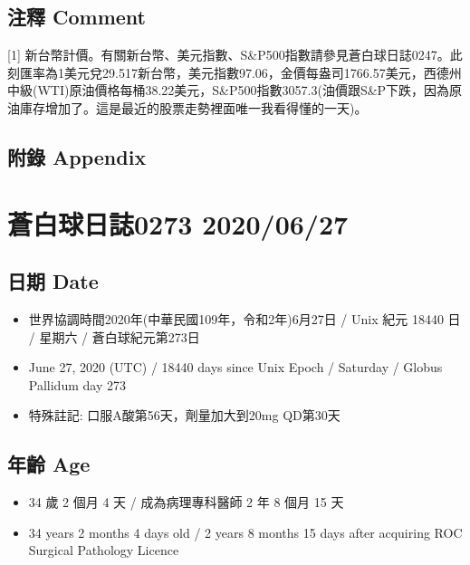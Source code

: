 \documentclass[
]{article}
\providecommand{\tightlist}{%
  \setlength{\itemsep}{0pt}\setlength{\parskip}{0pt}}
\begin{document}
\hypertarget{ux6ce8ux91cb-comment-21}{%
\subsection{注釋 Comment}\label{ux6ce8ux91cb-comment-21}}

{[}1{]}
新台幣計價。有關新台幣、美元指數、S\&P500指數請參見蒼白球日誌0247。此刻匯率為1美元兌29.517新台幣，美元指數97.06，金價每盎司1766.57美元，西德州中級(WTI)原油價格每桶38.22美元，S\&P500指數3057.3(油價跟S\&P下跌，因為原油庫存增加了。這是最近的股票走勢裡面唯一我看得懂的一天)。

\hypertarget{ux9644ux9304-appendix-21}{%
\subsection{附錄 Appendix}\label{ux9644ux9304-appendix-21}}

\hypertarget{ux84bcux767dux7403ux65e5ux8a8c0273-20200627}{%
\section{蒼白球日誌0273
2020/06/27}\label{ux84bcux767dux7403ux65e5ux8a8c0273-20200627}}

\hypertarget{ux65e5ux671f-date-22}{%
\subsection{日期 Date}\label{ux65e5ux671f-date-22}}

\begin{itemize}
\tightlist
\item
  世界協調時間2020年(中華民國109年，令和2年)6月27日 / Unix 紀元 18440 日
  / 星期六 / 蒼白球紀元第273日
\item
  June 27, 2020 (UTC) / 18440 days since Unix Epoch / Saturday / Globus
  Pallidum day 273
\item
  特殊註記: 口服A酸第56天，劑量加大到20mg QD第30天
\end{itemize}

\hypertarget{ux5e74ux9f61-age-22}{%
\subsection{年齡 Age}\label{ux5e74ux9f61-age-22}}

\begin{itemize}
\tightlist
\item
  34 歲 2 個月 4 天 / 成為病理專科醫師 2 年 8 個月 15 天
\item
  34 years 2 months 4 days old / 2 years 8 months 15 days after
  acquiring ROC Surgical Pathology Licence
\end{itemize}
\end{document}
